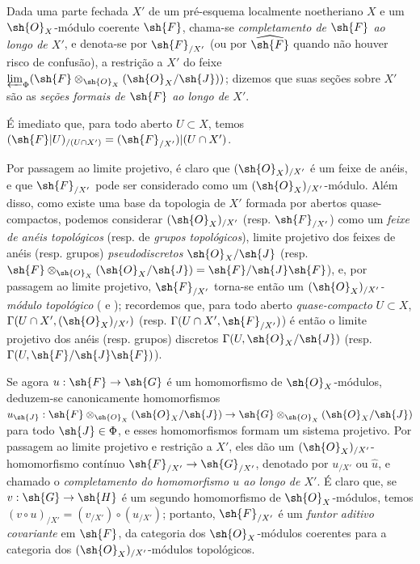 \documentclass[oneside]{amsart}
\makeatletter
\newcommand{\ega@arrow}[2]{\mathchoice{#1}{#2}{#2}{#2}}
\renewcommand{\to}{\ega@arrow{\longrightarrow}{\rightarrow}}
\newcommand{\oldpage}[2][]{{\marginnote{\normalfont\textbf{#1}~|~#2}}\ignorespaces}
\let\EGAOriginalLabel\label
\renewcommand{\label}[1]{\phantomsection\EGAOriginalLabel{#1}}
\makeatother
\begin{document}
\begin{definition}[10.8.4]
\label{I.10.8.4}
Dada uma parte fechada $X'$ de um pré-esquema localmente noetheriano $X$ e um $\sh{O}_X$-módulo coerente $\sh{F}$, chama-se \emph{completamento de $\sh{F}$ ao longo de $X'$}, e denota-se por $\sh{F}_{/X'}$ (ou por $\widehat{\sh{F}}$ quando não houver risco de confusão), a restrição a $X'$ do feixe
\oldpage[I]{195}
$\varprojlim_\Phi(\sh{F}\otimes_{\sh{O}_X}(\sh{O}_X/\sh{J}))$; dizemos que suas seções sobre $X'$ são as \emph{seções formais de $\sh{F}$ ao longo de $X'$}.
\end{definition}

É imediato que, para todo aberto $U\subset X$, temos $(\sh{F}|U)_{/(U\cap X')}=(\sh{F}_{/X'})|(U\cap X')$.

Por passagem ao limite projetivo, é claro que $(\sh{O}_X)_{/X'}$ é um feixe de anéis, e que $\sh{F}_{/X'}$ pode ser considerado como um $(\sh{O}_X)_{/X'}$-módulo.
Além disso, como existe uma base da topologia de $X'$ formada por abertos quase-compactos, podemos considerar $(\sh{O}_X)_{/X'}$ (resp. $\sh{F}_{/X'}$) como um \emph{feixe de anéis topológicos} (resp. de \emph{grupos topológicos}), limite projetivo dos feixes de anéis (resp. grupos) \emph{pseudodiscretos} $\sh{O}_X/\sh{J}$ (resp. $\sh{F}\otimes_{\sh{O}_X}(\sh{O}_X/\sh{J})=\sh{F}/\sh{J}\sh{F}$), e, por passagem ao limite projetivo, $\sh{F}_{/X'}$ torna-se então um \emph{$(\sh{O}_X)_{/X'}$-módulo topológico} ( e ); recordemos que, para todo aberto \emph{quase-compacto} $U\subset X$, $\Gamma(U\cap X',(\sh{O}_X)_{/X'})$ (resp. $\Gamma(U\cap X',\sh{F}_{/X'})$) é então o limite projetivo dos anéis (resp. grupos) discretos $\Gamma(U,\sh{O}_X/\sh{J})$ (resp. $\Gamma(U,\sh{F}/\sh{J}\sh{F})$).

Se agora $u:\sh{F}\to\sh{G}$ é um homomorfismo de $\sh{O}_X$-módulos, deduzem-se canonicamente homomorfismos $u_\sh{J}:\sh{F}\otimes_{\sh{O}_X}(\sh{O}_X/\sh{J})\to\sh{G}\otimes_{\sh{O}_X}(\sh{O}_X/\sh{J})$ para todo $\sh{J}\in\Phi$, e esses homomorfismos formam um sistema projetivo.
Por passagem ao limite projetivo e restrição a $X'$, eles dão um $(\sh{O}_X)_{/X'}$-homomorfismo contínuo $\sh{F}_{/X'}\to\sh{G}_{/X'}$, denotado por $u_{/X'}$ ou $\widehat{u}$, e chamado o \emph{completamento do homomorfismo $u$ ao longo de $X'$}.
É claro que, se $v:\sh{G}\to\sh{H}$ é um segundo homomorfismo de $\sh{O}_X$-módulos, temos $(v\circ u)_{/X'}=(v_{/X'})\circ(u_{/X'})$; portanto, $\sh{F}_{/X'}$ é um \emph{funtor aditivo covariante} em $\sh{F}$, da categoria dos $\sh{O}_X$-módulos coerentes para a categoria dos $(\sh{O}_X)_{/X'}$-módulos topológicos.
\end{document}
